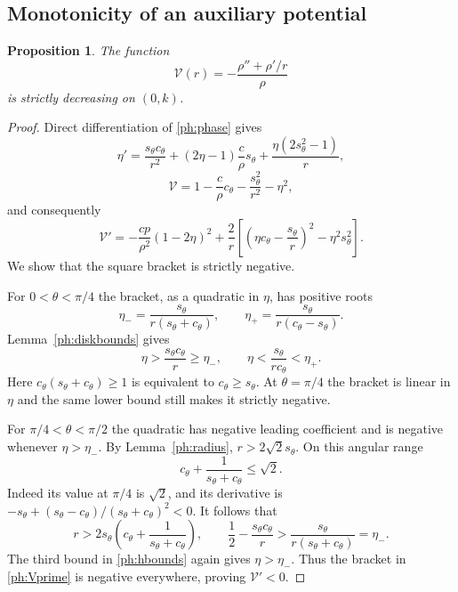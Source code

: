 \documentclass[11pt,letterpaper,reqno]{amsart}
\newtheorem{proposition}[theorem]{Proposition}
\theoremstyle{definition}
\begin{document}
\subsection{Monotonicity of an auxiliary potential}
\begin{proposition}\label{ph:potential}
The function
\[
 \mathcal V(r)=-\frac{\rho''+\rho'/r}{\rho}
\]
is strictly decreasing on $(0,k)$.
\end{proposition}
\begin{proof}
Direct differentiation of \eqref{ph:phase} gives
\[
 \eta'=\frac{s_\theta c_\theta}{r^2}+(2\eta-1)\frac{c}{\rho} s_\theta
                     +\frac{\eta(2s_\theta^2-1)}r,
\]
\[
 \mathcal V=1-\frac{c}{\rho} c_\theta-\frac{s_\theta^2}{r^2}-\eta^2,
\]
and consequently
\begin{equation}\label{ph:Vprime}
 \mathcal V'=-\frac{cp}{\rho^2}(1-2\eta)^2
 +\frac2r\left[\left(\eta c_\theta-\frac{s_\theta}{r}\right)^2-\eta^2s_\theta^2\right].
\end{equation}
We show that the square bracket is strictly negative.

For $0<\theta<\pi/4$ the bracket, as a quadratic in $\eta$, has
positive roots
\[
 \eta_- =\frac{s_\theta}{r(s_\theta+c_\theta)},\qquad \eta_+=\frac{s_\theta}{r(c_\theta-s_\theta)}.
\]
Lemma~\ref{ph:diskbounds} gives
\[
 \eta>\frac{s_\theta c_\theta}{r}\ge \eta_-,\qquad
 \eta<\frac{s_\theta}{r c_\theta}<\eta_+.
\]
Here $c_\theta(s_\theta+c_\theta)\ge1$ is equivalent to $c_\theta\ge s_\theta$.
At $\theta=\pi/4$ the bracket is linear in $\eta$ and the same lower
bound still makes it strictly negative.

For $\pi/4<\theta<\pi/2$ the quadratic has negative leading
coefficient and is negative whenever $\eta>\eta_-$. By
Lemma~\ref{ph:radius}, $r>2\sqrt2s_\theta$. On this angular range
\[
 c_\theta+\frac1{s_\theta+c_\theta}\le\sqrt2.
\]
Indeed its value at $\pi/4$ is $\sqrt2$, and its derivative is
$-s_\theta+(s_\theta-c_\theta)/(s_\theta+c_\theta)^2<0$. It follows that
\[
 r>2s_\theta\left(c_\theta+\frac1{s_\theta+c_\theta}\right),\qquad
 \frac12-\frac{s_\theta c_\theta}{r}>\frac{s_\theta}{r(s_\theta+c_\theta)}=\eta_-.
\]
The third bound in \eqref{ph:hbounds} again gives $\eta>\eta_-$.
Thus the bracket in \eqref{ph:Vprime} is negative everywhere, proving
$\mathcal V'<0$.
\end{proof}
\end{document}
